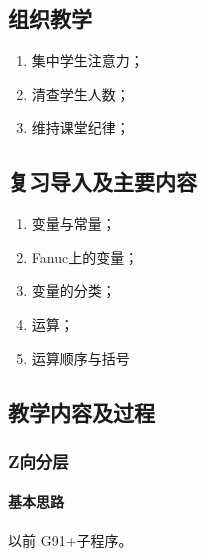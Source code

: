 \jxhj{%
	}

\makeshouye %

\subsection{组织教学}
\begin{enumerate}[\hspace{2em}1、]
	\item 集中学生注意力；
	\item 清查学生人数；
	\item 维持课堂纪律；
\end{enumerate}
\subsection{复习导入及主要内容}
\begin{enumerate}[\hspace{2em}1、]
\item 变量与常量；
\item Fanuc上的变量；
\item 变量的分类；
\item 运算；
\item 运算顺序与括号
\end{enumerate}
\subsection{教学内容及过程}
\subsubsection{Z向分层} 
\paragraph{基本思路} 
以前 G91+子程序。

